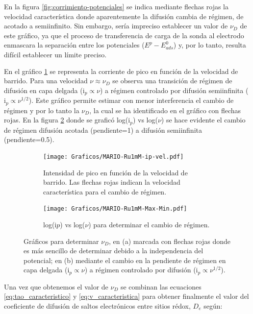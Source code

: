 		 En la figura \ref{fig:corrimiento-potenciales} se indica mediante flechas rojas la velocidad característica donde aparentemente la difusión cambia de régimen, de acotado a semiinfinito. Sin embargo, sería impreciso establecer un valor de $\nu_{\scriptscriptstyle{D}}$ de este gráfico, ya que el proceso de transferencia de carga de la sonda al electrodo enmascara la separación entre los potenciales ($E^p-E^0_{ads}$) y, por lo tanto, resulta difícil establecer un límite preciso.
		   	 	 
         En el gráfico \ref{fig:ip-vel} se representa la corriente de pico en función de la velocidad de barrido. Para una velocidad $\nu \approx \nu_{\scriptscriptstyle{D}}$ se observa una transición de régimen de difusión en capa delgada ($\text{i}_{p} \propto \nu$) a régimen controlado por difusión semiinfinita ($\text{i}_{p} \propto \nu^{1/2}$). Este gráfico permite estimar con menor interferencia el cambio de régimen y por lo tanto la $\nu_{\scriptscriptstyle{D}}$, la cual se ha identificado en el gráfico con flechas rojas. En la figura \ref{fig:logj-logv} donde se graficó log({i$_p$}) vs log({$\nu$}) se hace evidente el cambio de régimen difusión acotada (pendiente=1) a difusión semiinfinita (pendiente=0.5).

         	\begin{figure}[ht!]
			 	 \begin{subfigure}[t]{0.5\textwidth}
			 	 \texttt{[image: Graficos/MARIO-Ru1mM-ip-vel.pdf]}
				  \caption{Intensidad de pico  en función de la velocidad de barrido. Las flechas rojas indican la velocidad característica para el cambio de régimen.}
			 	 \label{fig:ip-vel}
		  	  	 \end{subfigure}	
			 	 \begin{subfigure}[t]{0.5\textwidth}
			  	 \texttt{[image: Graficos/MARIO-Ru1mM-Max-Min.pdf]}
			  	 \caption{log(i$p$) vs log($\nu$) para determinar el cambio de régimen.}
			 	 \label{fig:logj-logv}
		  		 \end{subfigure}
				  \caption[Cálculo de velocidad de barrido característica]{Gráficos para determinar $\nu_{\scriptscriptstyle{D}}$, en (a) marcada con flechas rojas donde es más sencillo de determinar debido a la independencia del potencial; en (b) mediante el cambio en la pendiente de  régimen en capa delgada ($\text{i}_{p} \propto \nu$) a régimen controlado por difusión ($\text{i}_{p} \propto \nu^{1/2}$).}
			 	 \label{fig:ip-vel2}
			 	 \end{figure}

		 \vspace*{3mm} Una vez que obtenemos el valor de  $\nu_{\scriptscriptstyle{D}}$ se combinan las ecuaciones \ref{eq:tao_caracteristico} y \ref{eq:v_caracteristica} para obtener finalmente el valor del coeficiente de difusión de saltos electrónicos entre sitios rédox,  $D_e$ según: 

